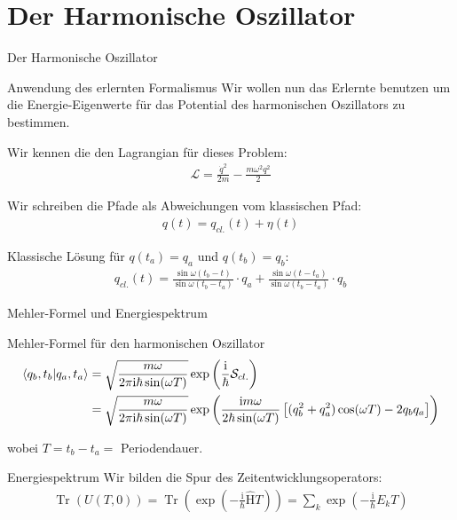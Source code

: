 \section{Der Harmonische Oszillator}
\begin{frame}{Der Harmonische Oszillator}
\begin{block}{\hfill Anwendung des erlernten Formalismus \hfill}
Wir wollen nun das Erlernte benutzen um die Energie-Eigenwerte für das  Potential des harmonischen Oszillators zu bestimmen.
\end{block}
Wir kennen die den Lagrangian für dieses Problem: 
\begin{align*}
	\mathcal{L} = \frac{\dot{q}^2}{2m} - \frac{m\omega^2q^2}{2} 
\end{align*}

Wir schreiben die Pfade als Abweichungen vom klassischen Pfad:
\begin{align*}
	q(t) = q_{cl.}(t) + \eta(t)
\end{align*}

Klassische Lösung für $q(t_a) = q_a$ und $q(t_b) = q_b$:
\begin{align*}
	q_{cl.}(t) = \frac{\sin \omega(t_b-t)}{\sin \omega(t_b-t_a)} \cdot q_a + \frac{\sin \omega(t-t_a)}{\sin \omega(t_b-t_a)} \cdot q_b
\end{align*}
\end{frame}

\begin{frame}{Mehler-Formel und Energiespektrum}
\begin{block}{\hfill Mehler-Formel für den harmonischen Oszillator\hfill }
	\begin{align*}
		\braket{q_b,t_b}{q_a,t_a} &= \sqrt{\frac{m\omega}{2\pi\mathrm{i}\hbar\sin(\omega T)}} \exp\left(\frac{\mathrm{i}}{\hbar}\mathcal{S}_{cl.} \right) \\ &= \sqrt{\frac{m\omega}{2\pi\mathrm{i}\hbar \sin(\omega T)}} \exp\left(\frac{\mathrm{i}m\omega}{2\hbar\sin(\omega T)}\left[(q_b^2+q_a^2)\cos(\omega T)- 2q_bq_a\right] \right)
	\end{align*}
\end{block}
wobei $T = t_b-t_a = $ Periodendauer. 
\vfill
\begin{block}{\hfill Energiespektrum \hfill}
Wir bilden die Spur des Zeitentwicklungsoperators:
\begin{align*}
	\operatorname{Tr}(U(T,0)) = \operatorname{Tr}\left(\exp\left(-\frac{\mathrm{i}}{\hbar}\hat{\text{H}}T\right)\right) 
	= \sum_k \exp\left(-\frac{\mathrm{i}}{\hbar}E_k T \right)
\end{align*}
\end{block}	
\end{frame}

